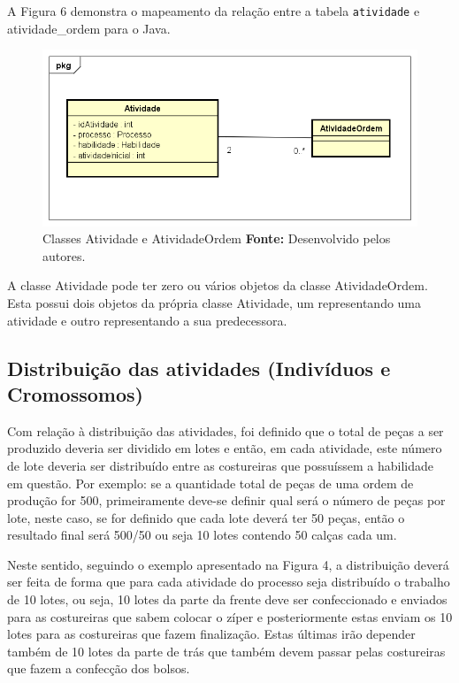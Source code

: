 \par A Figura 6 demonstra o mapeamento da relação entre a tabela
\texttt{atividade} e atividade\_ordem para o Java.

\begin{figure}[h!]
	\centerline{\includegraphics[scale=0.7]{./imagens/atividade_diagram.png}}
	\caption[Classes Atividade e AtividadeOrdem]
	{Classes Atividade e AtividadeOrdem \textbf{Fonte:} Desenvolvido pelos
	autores.}
	\label{fig:exemplo1}
\end{figure} 

\par A classe Atividade pode ter zero ou vários objetos da classe
AtividadeOrdem.
Esta possui dois objetos da própria classe Atividade, um representando uma
atividade e outro representando a sua predecessora.

\subsection{Distribuição das atividades (Indivíduos e Cromossomos)}

\par Com relação à distribuição das atividades, foi definido que o total de
peças a ser produzido deveria ser dividido em lotes e então, em cada atividade,
este número de lote deveria ser distribuído entre as costureiras que possuíssem a habilidade em questão. Por exemplo: se a quantidade total de peças de uma ordem de produção for 500,
primeiramente deve-se definir qual será o número de peças por lote, neste caso, se for definido que cada lote  
deverá ter 50 peças, então o resultado final será 500/50 ou seja 10 lotes contendo 50 calças cada um. 

\par Neste sentido, seguindo o exemplo apresentado  na Figura 4, a distribuição
deverá ser feita de forma que para cada atividade do processo seja distribuído o trabalho de 10 lotes, ou seja, 10 lotes da parte da frente deve ser confeccionado e enviados para as costureiras que sabem colocar
o zíper e posteriormente estas enviam os 10 lotes para as costureiras que fazem finalização. Estas últimas irão depender
também de 10 lotes da parte de trás que também devem passar pelas costureiras que fazem a confecção dos bolsos. 


